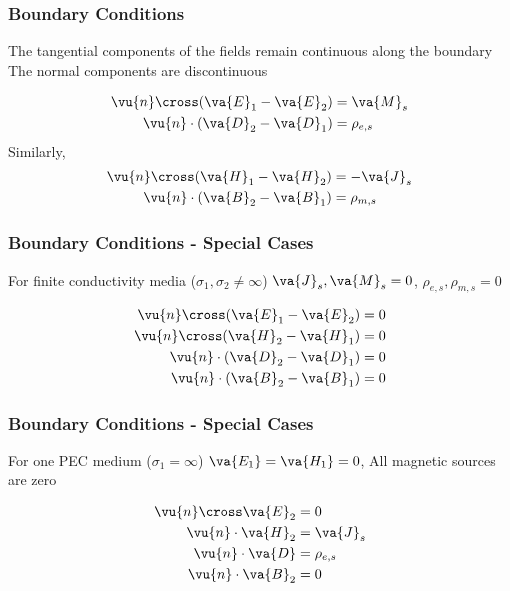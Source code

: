 \documentclass[10pt, compress]{beamer}
\newcommand{\p}{\rho}  %
\renewcommand{\inf}{\infty}  %
\begin{document}
\begin{frame}
  \frametitle{Boundary Conditions}
  \begin{outline}
    \1 The tangential components of the fields remain continuous along the boundary
    \1 The normal components are discontinuous
  \end{outline}
  \begin{align*}
    \vu{n} \cross (\va{E}_1 - \va{E}_2) &= \va{M}_s \\
    \vu{n} \cdot (\va{D}_2 - \va{D}_1) &= \p_{e,s} \\
  \end{align*}
  Similarly,
  \begin{align*}
     \vu{n} \cross (\va{H}_1 - \va{H}_2) &= -\va{J}_s \\
    \vu{n} \cdot (\va{B}_2 - \va{B}_1) &= \p_{m,s} \\
  \end{align*}
\end{frame}
\begin{frame}
  \frametitle{Boundary Conditions - Special Cases}
  \begin{outline}
    \1 For finite conductivity media ($\sigma_1, \sigma_2 \neq \inf$)
      \2 $\va{J}_s, \va{M}_s = 0$, $\p_{e,s}, \p_{m,s} = 0$
  \end{outline}
  \begin{align*}
    \vu{n} \cross (\va{E}_1 - \va{E}_2) &= 0 \\
    \vu{n} \cross (\va{H}_2 - \va{H}_1) &= 0 \\
    \vu{n} \cdot (\va{D}_2 - \va{D}_1) &= 0 \\
    \vu{n} \cdot (\va{B}_2 - \va{B}_1) &= 0 \\
  \end{align*}
\end{frame}
\begin{frame}
  \frametitle{Boundary Conditions - Special Cases}
  \begin{outline}
    \1 For one PEC medium  ($\sigma_1 = \inf$)
      \2 $\va{E_1} = \va{H_1} = 0$, All magnetic sources are zero
  \end{outline}
  \begin{align*}
    \vu{n} \cross \va{E}_2 &= 0 \\
    \vu{n} \cdot \va{H}_2 &= \va{J}_s \\
    \vu{n} \cdot \va{D} &= \p_{e,s} \\
    \vu{n} \cdot \va{B}_2 &= 0 \\
  \end{align*}
\end{frame}
\end{document}
